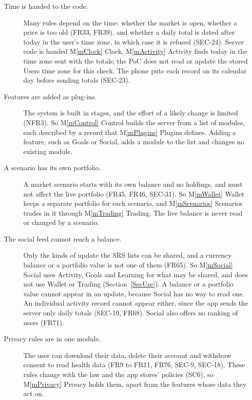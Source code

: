 \documentclass[12pt, titlepage]{article}
\newcommand{\mref}[1]{M\ref{#1}}
\begin{document}
\begin{description}
\item[Time is handed to the code.] Many rules depend on the time: whether the
  market is open, whether a price is too old (FR33, FR39), and whether a daily
  total is dated after today in the user's time zone, in which case it is
  refused (SEC-24). Server code is handed \mref{mClock} Clock.
  \mref{mActivity} Activity finds today in the time zone sent with the totals;
  the PoC does not read or update the stored Users time zone for this check.
  The phone puts each record on its calendar day before sending totals
  (SEC-23).

\item[Features are added as plug-ins.] The system is built in stages, and the
  effort of a likely change is limited (NFR3). So \mref{mControl} Control
  builds the server from a list of modules, each described by a record that
  \mref{mPlugins} Plugins defines. Adding a feature, such as Goals or Social,
  adds a module to the list and changes no existing module.

\item[A scenario has its own portfolio.] A market scenario starts with its own
  balance and no holdings, and must not affect the live portfolio (FR45, FR46,
  SEC-31). So \mref{mWallet} Wallet keeps a separate portfolio for each
  scenario, and \mref{mScenarios} Scenarios trades in it through
  \mref{mTrading} Trading. The live balance is never read or changed by a
  scenario.

\item[The social feed cannot reach a balance.] Only the kinds of update the
  SRS lists can be shared, and a currency balance or a portfolio value is not
  one of them (FR65). So \mref{mSocial} Social uses Activity, Goals and
  Learning for what may be shared, and does not use Wallet or Trading
  (Section~\ref{SecUse}). A balance or a portfolio value cannot appear in an
  update, because Social has no way to read one. An individual activity record
  cannot appear either, since the app sends the server only daily totals
  (SEC-10, FR68). Social also offers no ranking of users (FR71).

\item[Privacy rules are in one module.] The user can download their data,
  delete their account and withdraw consent to read health data (FR9 to FR11,
  FR76, SEC-9, SEC-18). These rules change with the law and the app stores'
  policies (SC6), so \mref{mPrivacy} Privacy holds them, apart from the
  features whose data they act on.


\end{description}
\end{document}

